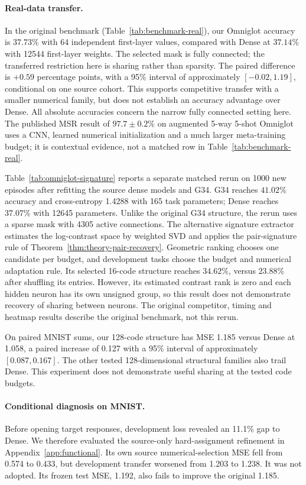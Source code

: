 \paragraph{Real-data transfer.}
In the original benchmark (Table~\ref{tab:benchmark-real}), our Omniglot
accuracy is $37.73\%$ with 64 independent first-layer
values, compared with Dense at $37.14\%$ with 12544 first-layer weights.
The selected mask is fully connected; the transferred restriction here
is sharing rather than sparsity.
The paired difference is $+0.59$ percentage points, with a 95\% interval
of approximately $[-0.02,1.19]$, conditional on one source cohort.
This supports competitive transfer with a smaller numerical family,
but does not establish an accuracy advantage over Dense. All absolute
accuracies concern the narrow fully connected setting here. The
published MSR result of $97.7\pm0.2\%$ on augmented 5-way 5-shot
Omniglot~\cite{zhou2021meta} uses a CNN, learned numerical initialization
and a much larger meta-training budget; it is contextual evidence,
not a matched row in Table~\ref{tab:benchmark-real}.

Table~\ref{tab:omniglot-signature} reports a separate matched rerun
on 1000 new episodes after refitting the source dense models and G34.
G34 reaches $41.02\%$ accuracy and cross-entropy 1.4288 with 165 task
parameters; Dense reaches $37.07\%$ with 12645 parameters. Unlike the
original G34 structure, the rerun uses a sparse mask with 4305 active
connections. The alternative signature extractor estimates the
log-contrast space by weighted SVD and applies the pair-signature rule
of Theorem~\ref{thm:theory-pair-recovery}. Geometric ranking chooses
one candidate per budget, and development tasks choose the budget
and numerical adaptation rule. Its selected 16-code structure reaches
$34.62\%$, versus $23.88\%$ after shuffling its entries. However, its
estimated contrast rank is zero and each hidden neuron has its own
unsigned group, so this result does not demonstrate recovery of
sharing between neurons. The original competitor, timing and heatmap
results describe the original benchmark, not this rerun.

On paired MNIST sums, our 128-code structure has MSE 1.185 versus
Dense at 1.058, a paired increase of 0.127 with a 95\% interval of
approximately $[0.087,0.167]$. The other tested 128-dimensional
structural families also trail Dense. This experiment does not
demonstrate useful sharing at the tested code budgets.

\paragraph{Conditional diagnosis on MNIST.}
Before opening target responses, development loss revealed an 11.1\%
gap to Dense. We therefore evaluated the source-only hard-assignment
refinement in Appendix~\ref{app:functional}. Its own source
numerical-selection MSE fell from 0.574 to 0.433, but development
transfer worsened from 1.203 to 1.238. It was not adopted. Its frozen
test MSE, 1.192, also fails to improve the original 1.185.

